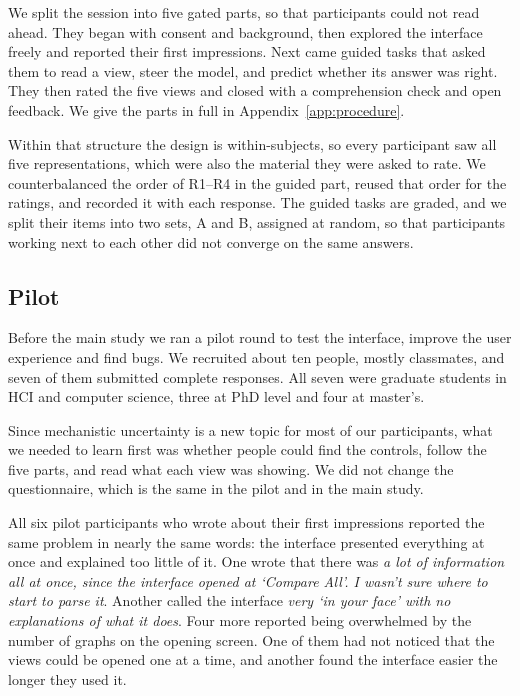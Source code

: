 \documentclass[sigconf]{acmart}
\newcommand{\pq}[1]{\emph{\guillemotleft #1\guillemotright}}
\begin{document}
We split the session into five gated parts, so that participants could not read ahead. They began
with consent and background, then explored the interface freely and reported their first impressions. Next came
guided tasks that asked them to read a view, steer the model, and predict whether its answer was right. They
then rated the five views and closed with a comprehension check and open feedback. We give the parts in full in
Appendix~\ref{app:procedure}.

Within that structure the design is within-subjects, so every participant saw all five representations, which
were also the material they were asked to rate. We counterbalanced the order of R1--R4 in the guided part,
reused that order for the ratings, and recorded it with each response. The guided tasks are graded, and we
split their items into two sets, A and B, assigned at random, so that participants working next to each other
did not converge on the same answers.

\subsection{Pilot}

Before the main study we ran a pilot round to test the interface, improve the user experience and find bugs.
We recruited about ten people, mostly classmates, and seven of them submitted complete responses. All seven
were graduate students in HCI and computer science, three at PhD level and four at master's.

Since mechanistic uncertainty is a new topic for most of our participants, what we needed to learn first was
whether people could find the controls, follow the five parts, and read what each view was showing. We did not
change the questionnaire, which is the same in the pilot and in the main study.

All six pilot participants who wrote about their first impressions reported the same problem in nearly the same
words: the interface presented everything at once and explained too little of it. One wrote that there was
\pq{a lot of information all at once, since the interface opened at `Compare All'. I wasn't sure where to start
to parse it}. Another called the interface \pq{very `in your face' with no explanations of what it does}. Four
more reported being overwhelmed by the number of graphs on the opening screen. One of them had not noticed that
the views could be opened one at a time, and another found the interface easier the longer they used it.
\end{document}
